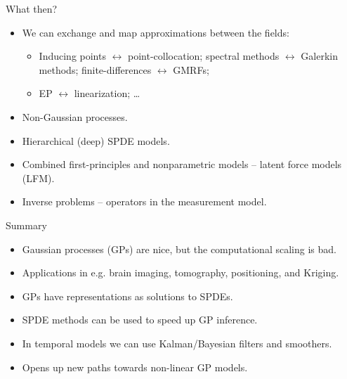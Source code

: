 \documentclass[first=dgreen,second=purple,presentation]{elecslides}
\begin{document}
\begin{frame}{What then?}

\begin{itemize}[<+->]
\item We can \alert{exchange and map approximations} between the fields:
\begin{itemize}[<+->]
\item Inducing points $\leftrightarrow$ point-collocation; spectral methods $\leftrightarrow$ Galerkin methods; finite-differences $\leftrightarrow$ GMRFs;
\item EP $\leftrightarrow$ linearization; \ldots
\end{itemize}
\item \alert{Non-Gaussian} processes.
\item \alert{Hierarchical} (deep) \alert{SPDE models}.
\item \alert{Combined first-principles} and nonparametric models -- latent force models (LFM).
\item \alert{Inverse problems} -- operators in the measurement model.
\end{itemize}

\end{frame}

\begin{frame}{Summary}
\begin{itemize}[<+->]
\item Gaussian processes (GPs) are nice, \alert{but the computational scaling is bad.}
\item Applications in e.g. \alert{brain imaging, tomography, positioning, and Kriging}.
\item GPs have representations as \alert{solutions to SPDEs}.
\item SPDE methods can be used to \alert{speed up GP inference}.
\item In temporal models we can use \alert{Kalman/Bayesian filters and smoothers}.
\item Opens up new paths towards \alert{non-linear GP models}.
\end{itemize}
\end{frame}


\end{document}
